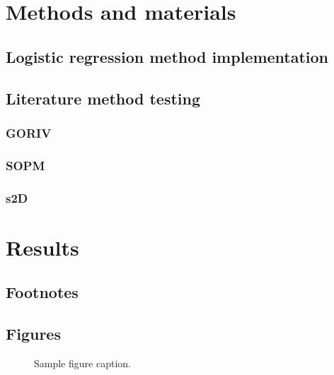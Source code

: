 \documentclass{article}
\begin{document}
\section{Methods and materials}

\subsection{Logistic regression method implementation}

\subsection{Literature method testing}

\subsubsection{GORIV}

\subsubsection{SOPM}

\subsubsection{s2D}


\section{Results}

\subsection{Footnotes}

\subsection{Figures}

\begin{figure}[h]
  \centering
  \caption{Sample figure caption.}
\end{figure}
\end{document}

